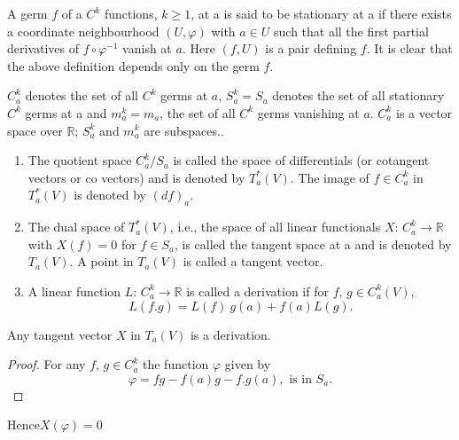\begin{defi*} %
  A germ $f$ of a $C^k$ functions, $k \ge 1$, at a is said to be
  stationary at a if there exists a coordinate neighbourhood $(U,
  \varphi)$ with $a \in U$ such that all the first partial derivatives
  of $f \circ \varphi^{-1}$ vanish at $a$. Here $(f, U)$ is a pair
  defining $f$. It is clear that the above definition depends only on
  the germ $f$. 
\end{defi*}

\begin{notation}
  $C^k_a$ denotes the set of all $C^k$ germs at $a$, $S^k_a = S_a$
  denotes the set of all stationary $C^k$ germs at a and $m^k_a =
  m_a$, the set of all $C^k$ germs vanishing at $a$. $C^k_a$ is a
  vector space over $\mathbb{R}$; $S^k_a$ and $m^k_a$ are subspaces.. 
\end{notation}

\begin{defi*}%
  \begin{enumerate}[(1)]
  \item The quotient space $C^k_a / S_a$ is called the space of
    differentials (or cotangent vectors or co vectors) and is denoted
    by $T^*_a (V)$. The image of $f \in C^k_a$ in $T^*_a(V)$ is
    denoted by $(df)_a$. 
  \item The dual space of $T^*_a (V)$, i.e., the space of all linear
    functionals $X$: $C^k_a \to \mathbb{R} $ with $X (f) = 0$ for $f
    \in S_a$, is called the tangent space at a and is denoted by $T_a
    (V)$. A point in $T_a (V)$ is called a tangent vector. 
  \item A linear function $L$: $C^k_a \to \mathbb{R}$ is called a
    derivation if for $f$, $g \in C^k_a (V)$, 
    $$
    L (f. g) = L(f) ~ g(a) + f(a) L(g).
    $$
  \end{enumerate}
\end{defi*}

\setcounter{proposition}{0}
\begin{proposition}\label{chap2:sec1:prop1} %
  Any tangent vector $X$ in $T_a (V)$ is a derivation.
\end{proposition}

\begin{proof}
  For any $f$, $g \in C^k_a $ the function $\varphi$ given by
  $$
  \varphi = f g - f(a) g - f. g (a), \text {  is   in } S_a.
  $$
\end{proof}

Hence\pageoriginale $X (\varphi) = 0$ 


